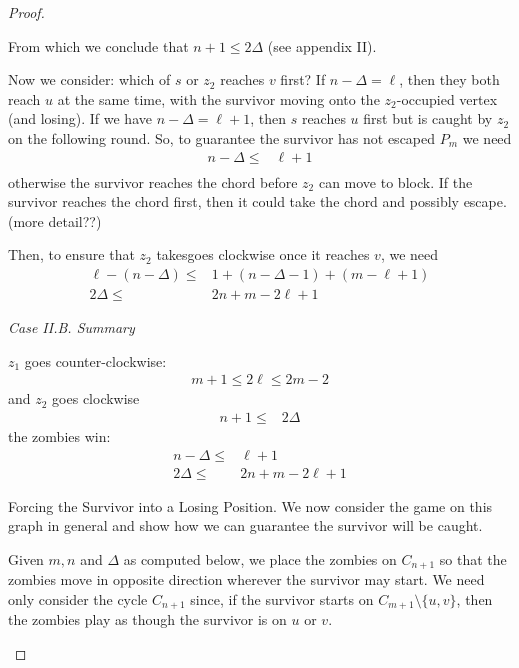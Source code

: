 \begin{proof}
\begin{proofpart}
  From which we conclude that $n+1 \leq 2 \Delta$ (see appendix II).

  Now we consider: which of $s$ or $z_2$ reaches $v$ first?
  If $n - \Delta = \ell$, then they both reach $u$ at the same time,
  with the survivor moving onto the $z_2$-occupied vertex (and losing).
  If we have $n - \Delta = \ell + 1$, then $s$ reaches $u$ first
  but is caught by $z_2$ on the following round.
  So, to guarantee the survivor has not escaped $P_m$ we need
  \begin{align*}
   n - \Delta \leq & \ell + 1 \\
  \end{align*}
  otherwise the survivor reaches the chord before $z_2$ can move
  to block. If the survivor reaches the chord first, then it could
  take the chord and possibly escape. (more detail??)

  Then, to ensure that $z_2$ takesgoes clockwise once
  it reaches $v$, we need
  \begin{align*}
   \ell - (n - \Delta) \leq & 1 + (n - \Delta - 1) + (m - \ell + 1) \\
   2 \Delta \leq            & 2n + m - 2\ell + 1
  \end{align*}

  \textit{Case II.B. Summary}

  $z_1$ goes counter-clockwise:
  \begin{align*}
   m + 1 \leq 2 \ell \leq 2m - 2
  \end{align*}
  and $z_2$ goes clockwise
  \begin{align*}
   n+1 \leq & 2 \Delta
  \end{align*}
  the zombies win:
  \begin{align*}
   n - \Delta \leq & \ell + 1           \\
   2 \Delta \leq   & 2n + m - 2\ell + 1
  \end{align*}


 \end{proofpart}

 \begin{proofpart} Forcing the Survivor into a Losing Position.
  We now consider the game on this graph in general and show
  how we can guarantee the survivor will be caught.

  Given $m, n$ and $\Delta$ as computed below, we place the
  zombies on $C_{n+1}$ so that the zombies move in
  opposite direction wherever the survivor may start.
  We need only consider the cycle $C_{n+1}$ since, if the survivor
  starts on $C_{m+1} \setminus \{u, v\}$, then the zombies play as
  though the survivor is on $u$ or $v$.


\end{proofpart}
\end{proof}
